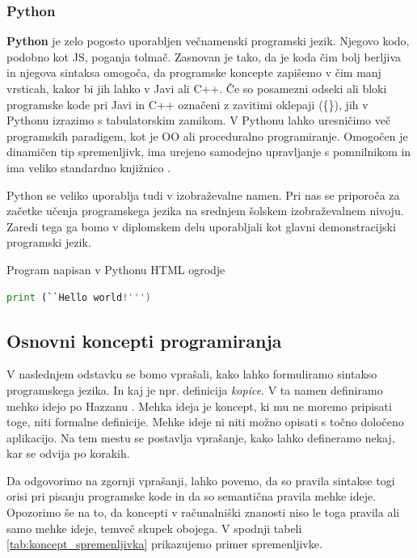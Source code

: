 \subsubsection{Python}
\label{sec:pj_python}

\textbf{Python} je zelo pogosto uporabljen večnamenski programski
jezik. Njegovo kodo, podobno kot JS, poganja tolmač. Zasnovan je tako,
da je koda čim bolj berljiva in njegova sintaksa omogoča, da
programske koncepte zapišemo v čim manj vrsticah, kakor bi jih lahko v
Javi ali C++. Če so posamezni odseki ali bloki programske kode pri
Javi in C++ označeni z zavitimi oklepaji (\{\}), jih v Pythonu
izrazimo s tabulatorskim zamikom. V Pythonu lahko uresničimo več
programskih paradigem, kot je OO ali proceduralno
programiranje. Omogočen je dinamičen tip spremenljivk, ima urejeno
samodejno upravljanje s pomnilnikom in ima veliko standardno
knjižnico \cite{wiki:python}.

Python se veliko uporablja tudi v izobraževalne namen. Pri nas se
priporoča za začetke učenja programskega jezika na srednjem šolskem
izobraževalnem nivoju. Zaredi tega ga bomo v diplomskem delu
uporabljali kot glavni demonstracijski programski jezik.

\begin{examplebox}[label={prog:py01}]{Program napisan v Pythonu
    HTML ogrodje}
\begin{lstlisting}[language=Python]
print (``Hello world!''')
\end{lstlisting}
\end{examplebox}

\subsection{Osnovni koncepti programiranja}
\label{sec:Osnvni koncepti_programiranja}

V naslednjem odstavku se bomo vprašali, kako lahko formuliramo sintakso
programskega jezika. In kaj je npr. definicija \emph{kopice}. V ta
namen definiramo mehko idejo po Hazzanu \cite{guideTCS}. Mehka ideja je koncept, ki mu ne moremo pripisati toge,
niti formalne definicije. Mehke ideje ni niti možno opisati s točno
določeno aplikacijo. Na tem mestu se postavlja vprašanje, kako lahko
defineramo nekaj, kar se odvija po korakih.

Da odgovorimo na zgornji vprašanji, lahko povemo, da so pravila
sintakse togi orisi pri pisanju programske kode in da so semantična
pravila mehke ideje. Opozorimo še na to, da koncepti v računalniški
znanosti niso le toga pravila ali samo mehke ideje, temveč skupek
obojega. V spodnji tabeli \ref{tab:koncept_spremenljivka} prikazujemo
primer spremenljivke.

